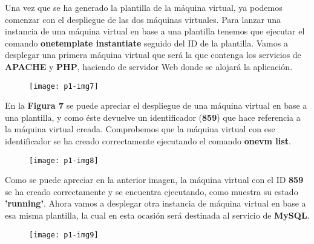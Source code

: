 \documentclass[10pt]{article}
\begin{document}
Una vez que se ha generado la plantilla de la máquina virtual, ya podemos comenzar con el despliegue de las dos máquinas virtuales. Para lanzar una instancia de una máquina virtual en base a una plantilla tenemos que ejecutar el comando \textbf{onetemplate instantiate} seguido del ID de la plantilla. Vamos a desplegar una primera máquina virtual que será la que contenga los servicios de \textbf{APACHE} y \textbf{PHP},  haciendo de servidor Web donde se alojará la aplicación.\\

\begin{figure}[H]
	\begin{center}
 		\texttt{[image: p1-img7]}
	\end{center} 
\end{figure}

En la \textbf{Figura 7} se puede apreciar el despliegue de una máquina virtual en base a una plantilla, y como éste devuelve un identificador (\textbf{859}) que hace referencia a la máquina virtual creada. Comprobemos que la máquina virtual con ese identificador se ha creado correctamente ejecutando el comando \textbf{onevm list}. \\

\begin{figure}[H]
	\begin{center}
 		\texttt{[image: p1-img8]}
	\end{center} 
\end{figure}

Como se puede apreciar en la anterior imagen, la máquina virtual con el ID \textbf{859} se ha creado correctamente y se encuentra ejecutando, como muestra su estado \textbf{'running'}. Ahora vamos a desplegar otra instancia de máquina virtual en base a esa misma plantilla, la cual en esta ocasión será destinada al servicio de \textbf{MySQL}.\\

\begin{figure}[H]
	\begin{center}
 		\texttt{[image: p1-img9]}
	\end{center} 
\end{figure}
\end{document}
